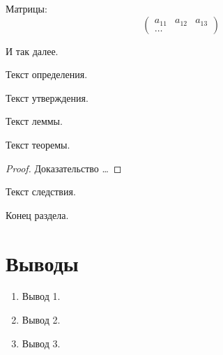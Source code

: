 Матрицы:
\[
  \begin{pmatrix}
    a_{11} & a_{12} & a_{13} \\
    \dots
  \end{pmatrix}
\]

И так далее.

\begin{definition} \label{definition1} Текст определения.
\end{definition}

\begin{proposition} \label{proposition1} Текст утверждения.
\end{proposition}

\begin{lemma} \label{lemma1} Текст леммы.
\end{lemma}

\begin{theorem} \label{theorem1} Текст теоремы.
\end{theorem}

\begin{proof}
  Доказательство \dots{}
\end{proof}

\begin{corollary} \label{corollary1} Текст следствия.
\end{corollary}

Конец раздела.\label{sect2_1-eof}


\section{Выводы} \label{sect2_2}

\begin{enumerate}
\item Вывод 1.
\item Вывод 2.
\item Вывод 3.
\end{enumerate}


